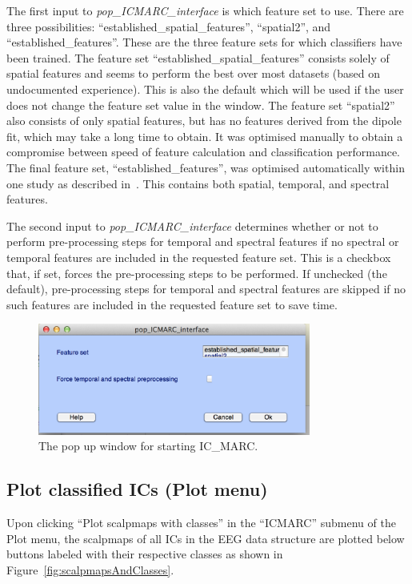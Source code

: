 \documentclass[10pt, twoside, a4paper]{article}
\begin{document}
The first input to \textit{pop\_ICMARC\_interface} is which feature
set to use. There are three possibilities:
``established\_spatial\_features'', ``spatial2'', and
``established\_features''. These are the three feature sets for which
classifiers have been trained. The feature set
``established\_spatial\_features'' consists solely of spatial features
and seems to perform the best over most datasets (based on
undocumented experience). This is also the default which will be used
if the user does not change the feature set value in the window. The
feature set ``spatial2'' also consists of only spatial features, but
has no features derived from the dipole fit, which may take a long
time to obtain. It was optimised manually to obtain a compromise
between speed of feature calculation and classification
performance. The final feature set, ``established\_features'', was
optimised automatically within one study as described
in~\cite{fro14}. This contains both spatial, temporal, and spectral
features.

The second input to \textit{pop\_ICMARC\_interface} determines whether
or not to perform pre-processing steps for temporal and spectral
features if no spectral or temporal features are included in the
requested feature set. This is a checkbox that, if set, forces the
pre-processing steps to be performed. If unchecked (the default),
pre-processing steps for temporal and spectral features are skipped if
no such features are included in the requested feature set to save time.

\begin{figure}
\center
\includegraphics[width=0.8\textwidth]{figs/pop_ICMARC_interface}
\caption{The pop up window for starting IC\_MARC.}
\label{fig:popICMARCinterface}
\end{figure}


\subsection{Plot classified ICs (Plot menu)}
Upon clicking ``Plot scalpmaps with classes'' in the ``ICMARC''
submenu of the Plot menu, the scalpmaps of all ICs in the EEG data
structure are plotted below buttons labeled with their respective
classes as shown in Figure~\ref{fig:scalpmapsAndClasses}. 
\end{document}
